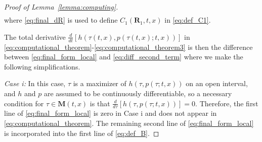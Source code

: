 \documentclass[10pt,conference]{ieeeconf}
\renewcommand{\(}{\left(}
\renewcommand{\)}{\right)}
\renewcommand{\[}{\left[}
\renewcommand{\]}{\right]}
\newcommand{\regularversion}[1]{\iffalse{}#1\fi}
\begin{document}
\begin{proof}[Proof of Lemma~\ref{lemma:computing}]
{\begin{align}
\end{align}}%
\regularversion{\begin{align}
    &\hspace{-10pt} \frac{d \boldsymbol{R}_{1\hspace{-1pt}}(\tau;t,x)}{d t} \hspace{-1.5pt}= - \frac{\partial h(\boldsymbol{R}_{1\hspace{-1pt}},p(\boldsymbol{R}_{1\hspace{-1pt}};\cdot))}{\partial x} \frac{\partial p(\boldsymbol{R}_{1\hspace{-1pt}};\cdot)}{\partial x} g(t,x)(u - \mu(t,x)) \nonumber \\ &\; \cdot \left( \frac{\partial h(\boldsymbol{R}_{1\hspace{-1pt}},p(\boldsymbol{R}_{1\hspace{-1pt}};\cdot))}{\partial t}  \hspace{-1.5pt}+\hspace{-1.5pt} \frac{\partial h(\boldsymbol{R}_{1\hspace{-1pt}},p(\boldsymbol{R}_{1\hspace{-1pt}};\cdot))}{\partial x}\frac{\partial p(\boldsymbol{R}_{1\hspace{-1pt}};\cdot)}{\partial \tau} \right)^{-1} \hspace{-8pt} \label{eq:final_dR}
\end{align}}%
where \eqref{eq:final_dR} is used to define $C_1(\boldsymbol{R}_1,t,x)$ in \eqref{eq:def_C1}. 

The total derivative $\frac{d}{dt}[h(\tau(t,x),p(\tau(t,x);t,x))]$ in \eqref{eq:computational_theorem}-\eqref{eq:computational_theorem3} is then the difference between \eqref{eq:final_form_local} and \eqref{eq:diff_second_term} where we make the following simplifications.

\emph{Case i:} In this case, $\tau$ is a maximizer of $h(\tau,p(\tau;t,x))$ on an open interval, and $h$ and $p$ are assumed to be continuously differentiable, so a necessary condition for $\tau \in \boldsymbol{M}(t,x)$ is that $\frac{d}{d\tau}[h(\tau,p(\tau;t,x))] = 0$. Therefore, the first line of \eqref{eq:final_form_local} is zero in Case i and does not appear in \eqref{eq:computational_theorem}. The remaining second line of \eqref{eq:final_form_local} is incorporated into the first line of \eqref{eq:def_B}.


\end{proof}
\end{document}
